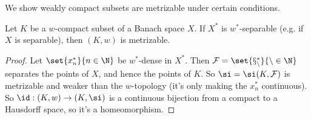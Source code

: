 We show weakly compact subsets are metrizable under certain conditions.
\begin{pr}
Let $K$ be a $w$-compact subset of a Banach space $X$. If $X^*$ is $w^*$-separable (e.g. if $X$ is separable), then $(K,w)$ is metrizable.
\end{pr}
\begin{proof}
Let $\set{x_n^*}{n\in \N}$ be $w^*$-dense in $X^*$. Then $\cal F=\set{x_n^*}{n\in \N}$ separates the points of $X$, and hence the points of $K$. So $\si=\si(K,\cal F)$ is metrizable and weaker than the $w$-topology (it's only making the $x_n^*$ continuous). So $\id:(K,w)\to (K,\si)$ is a continuous bijection from a compact to a Hausdorff space, so it's a homeomorphism.
\end{proof}

